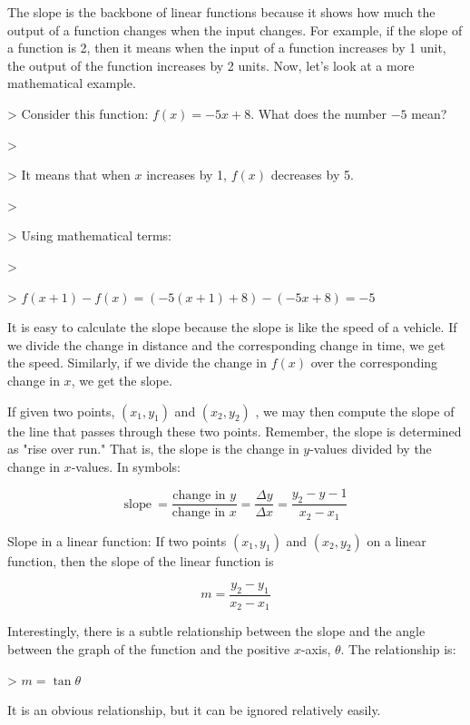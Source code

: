 The slope is the backbone of linear functions because it shows how much the output of a
function changes when the input changes. For example, if the slope of a function is 2,
then it means when the input of a function increases by 1 unit, the output of the function
increases by 2 units. Now, let's look at a more mathematical example.



> Consider this function: $f(x)=-5x+8$. What does the number $-5$ mean?

>

> It means that when $x$ increases by 1, $f(x)$ decreases by 5.

>

> Using mathematical terms:

>

> $f(x+1)-f(x)=(-5(x+1)+8)-(-5x+8)=-5$



It is easy to calculate the slope because the slope is like the speed of a vehicle. If we
divide the change in distance and the corresponding change in time, we get the speed.
Similarly, if we divide the change in $f(x)$ over the corresponding change in $x$, we get
the slope.



If given two points, $(x _1,y _1)$ and $(x _2,y _2)$ , we may then compute the slope of
the line that passes through these two points. Remember, the slope is determined as "rise
over run." That is, the slope is the change in $y$-values divided by the change in
$x$-values. In symbols:



$$\text{slope}~=\frac{\text{change in }y}{\text{change in }x}=\frac{\Delta y}{\Delta x}=\frac{y _2-y -1}{x _2-x _1}$$



Slope in a linear function: If two points $(x _1,y _1)$ and $(x _2,y _2)$ on a linear
function, then the slope of the linear function is



$$m=\frac{y _2-y _1}{x _2-x _1}$$



Interestingly, there is a subtle relationship between the slope and the angle between the
graph of the function and the positive $x$-axis, $\theta$. The relationship is:



> $m=\tan\theta$



It is an obvious relationship, but it can be ignored relatively easily.




